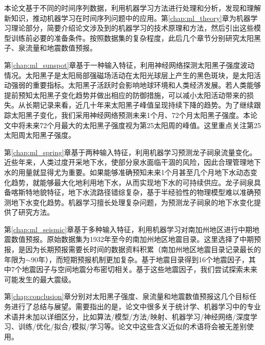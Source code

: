 本论文基于不同的时间序列数据，利用机器学习方法进行处理和分析，发现和理解新知识，推动机器学习在时间序列问题中的应用。第\ref{chap:ml_theory}章为机器学习理论部分，简要介绍论文涉及到的机器学习的技术原理和方法，然后引出这些模型训练前必要的准备条件。按照数据集的复杂程度，此后几个章节分别研究太阳黑子、泉流量和地震数值预报。

第\ref{chap:ml_sunspot}章基于一种输入特征，利用神经网络探测太阳黑子强度波动情况。太阳黑子是太阳局部强磁场活动在太阳光球层上产生的黑色斑块，是太阳活动强弱的重要指标。太阳黑子活跃时会影响地球环境和人类经济发展。若人类能够提前预知太阳黑子变化趋势并做出相应的防御措施，可以减小太阳活动带来的损失。从长期记录来看，近几十年来太阳黑子峰值呈现持续下降的趋势。为了继续跟踪太阳黑子变化，我们采用神经网络预测未来1个月、72个月太阳黑子强度。本论文中将未来72个月最大的太阳黑子强度视为第25太阳周的峰值。这里重点关注第25太阳周太阳黑子强度。

第\ref{chap:ml_spring}章基于两种输入特征，利用机器学习预测龙子祠泉流量变化。近些年来，人类过度开采地下水，使部分泉水面临干涸的风险，因此合理管理地下水的用量就显得尤为重要。如果能够准确预知未来1个月甚至几个月地下水动态变化趋势，就能够最大化地利用地下水，从而实现地下水的可持续供应。龙子祠泉具备喀斯特地貌特征，地下水流路径错综复杂，基于半经验性的物理模型难以准确预测地下水变化趋势。机器学习擅长处理复杂问题，为预测龙子祠泉的地下水变化提供了研究方法。

第\ref{chap:ml_seismic}章基于多种输入特征，利用机器学习对南加州地区进行中期地震数值预报。原始数据集为1932年至今的南加州地区地震目录。这里选择了中期预报，是因为长期预报需要长时间的数据资料积累（南加州地区地震目录记录最长的年限为$\sim$90年），而短期预报机制更加复杂。基于地震目录得到16个地震因子，其中7个地震因子与空间地震分布密切相关。基于这些地震因子，我们尝试探索未来可能发生的最大震级。

第\ref{chap:conclusion}章分别对太阳黑子强度、泉流量和地震数值预报这几个目标任务进行了总结与展望。需要指出的是，论文中很多关于统计学、机器学习中的专业术语并未加以详细区分，比如算法/模型/方法/映射、机器学习/神经网络/深度学习、训练/优化/拟合/模拟/学习等。论文中这些含义近似的术语将会被无差别使用。

